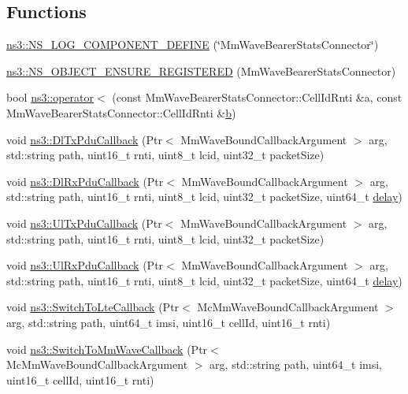 \subsection*{Functions}
\begin{DoxyCompactItemize}
\item 
\hyperlink{namespacens3_ada9f5b691db64ae1d636c2eb11bd7109}{ns3\+::\+N\+S\+\_\+\+L\+O\+G\+\_\+\+C\+O\+M\+P\+O\+N\+E\+N\+T\+\_\+\+D\+E\+F\+I\+NE} (\char`\"{}Mm\+Wave\+Bearer\+Stats\+Connector\char`\"{})
\item 
\hyperlink{namespacens3_aa116006c9a6cf960c43c128b94da212e}{ns3\+::\+N\+S\+\_\+\+O\+B\+J\+E\+C\+T\+\_\+\+E\+N\+S\+U\+R\+E\+\_\+\+R\+E\+G\+I\+S\+T\+E\+R\+ED} (Mm\+Wave\+Bearer\+Stats\+Connector)
\item 
bool \hyperlink{namespacens3_ab8c4633596e8b66923b0ece4e453f35c}{ns3\+::operator$<$} (const Mm\+Wave\+Bearer\+Stats\+Connector\+::\+Cell\+Id\+Rnti \&a, const Mm\+Wave\+Bearer\+Stats\+Connector\+::\+Cell\+Id\+Rnti \&\hyperlink{lte__pathloss_8m_a21ad0bd836b90d08f4cf640b4c298e7c}{b})
\item 
void \hyperlink{namespacens3_a3cc5fd7eca78e708a1b755df1c0fe398}{ns3\+::\+Dl\+Tx\+Pdu\+Callback} (Ptr$<$ Mm\+Wave\+Bound\+Callback\+Argument $>$ arg, std\+::string path, uint16\+\_\+t rnti, uint8\+\_\+t lcid, uint32\+\_\+t packet\+Size)
\item 
void \hyperlink{namespacens3_ae20a0f18644d29021b8b02024a9bfb71}{ns3\+::\+Dl\+Rx\+Pdu\+Callback} (Ptr$<$ Mm\+Wave\+Bound\+Callback\+Argument $>$ arg, std\+::string path, uint16\+\_\+t rnti, uint8\+\_\+t lcid, uint32\+\_\+t packet\+Size, uint64\+\_\+t \hyperlink{mmwave_2model_2fading-traces_2fading__trace__generator_8m_a7964e6aa8f61a9d28973c8267a606ad8}{delay})
\item 
void \hyperlink{namespacens3_aa2571376ec819fed3c4904b48a26636a}{ns3\+::\+Ul\+Tx\+Pdu\+Callback} (Ptr$<$ Mm\+Wave\+Bound\+Callback\+Argument $>$ arg, std\+::string path, uint16\+\_\+t rnti, uint8\+\_\+t lcid, uint32\+\_\+t packet\+Size)
\item 
void \hyperlink{namespacens3_acfcdeb4faee912d29413b2cbdc41d643}{ns3\+::\+Ul\+Rx\+Pdu\+Callback} (Ptr$<$ Mm\+Wave\+Bound\+Callback\+Argument $>$ arg, std\+::string path, uint16\+\_\+t rnti, uint8\+\_\+t lcid, uint32\+\_\+t packet\+Size, uint64\+\_\+t \hyperlink{mmwave_2model_2fading-traces_2fading__trace__generator_8m_a7964e6aa8f61a9d28973c8267a606ad8}{delay})
\item 
void \hyperlink{namespacens3_a333eb92711b0ee20ea21af119e8e4d36}{ns3\+::\+Switch\+To\+Lte\+Callback} (Ptr$<$ Mc\+Mm\+Wave\+Bound\+Callback\+Argument $>$ arg, std\+::string path, uint64\+\_\+t imsi, uint16\+\_\+t cell\+Id, uint16\+\_\+t rnti)
\item 
void \hyperlink{namespacens3_a9aa3110f65206a13cd8df86331a59532}{ns3\+::\+Switch\+To\+Mm\+Wave\+Callback} (Ptr$<$ Mc\+Mm\+Wave\+Bound\+Callback\+Argument $>$ arg, std\+::string path, uint64\+\_\+t imsi, uint16\+\_\+t cell\+Id, uint16\+\_\+t rnti)
\end{DoxyCompactItemize}
